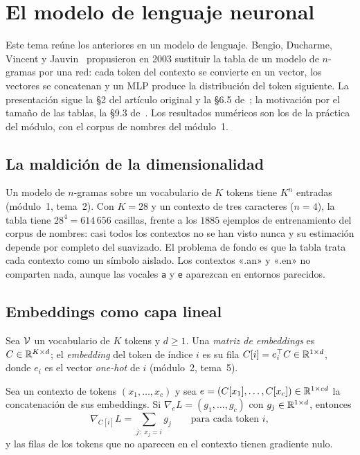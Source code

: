 \chapter{El modelo de lenguaje neuronal}
\label{tema:6}

Este tema reúne los anteriores en un modelo de lenguaje. Bengio, Ducharme, Vincent y Jauvin~\cite{bengio} propusieron en 2003 sustituir la tabla de un modelo de $n$-gramas por una red: cada token del contexto se convierte en un vector, los vectores se concatenan y un MLP produce la distribución del token siguiente. La presentación sigue la §2 del artículo original y la §6.5 de~\cite{jm3}; la motivación por el tamaño de las tablas, la §9.3 de~\cite{d2l}. Los resultados numéricos son los de la práctica del módulo, con el corpus de nombres del módulo~1.

\section{La maldición de la dimensionalidad}

Un modelo de $n$-gramas sobre un vocabulario de $K$ tokens tiene $K^{n}$ entradas (módulo~1, tema~2). Con $K=28$ y un contexto de tres caracteres ($n=4$), la tabla tiene $28^{4}=614\,656$ casillas, frente a los $1885$ ejemplos de entrenamiento del corpus de nombres: casi todos los contextos no se han visto nunca y su estimación depende por completo del suavizado. El problema de fondo es que la tabla trata cada contexto como un símbolo aislado. Los contextos «.an» y «.en» no comparten nada, aunque las vocales \texttt{a} y \texttt{e} aparezcan en entornos parecidos.

\section{Embeddings como capa lineal}

\begin{definicion}
Sea $\mathcal{V}$ un vocabulario de $K$ tokens y $d\ge 1$. Una \emph{matriz de embeddings} es $C\in\mathbb{R}^{K\times d}$; el \emph{embedding} del token de índice $i$ es su fila $C[i]=e_i^{\top}C\in\mathbb{R}^{1\times d}$, donde $e_i$ es el vector \emph{one-hot} de $i$ (módulo~2, tema~5).
\end{definicion}

\begin{proposicion}\label{prop:grad-embedding}
Sea un contexto de tokens $(x_1,\dots,x_c)$ y sea $e=(C[x_1],\dots,C[x_c])\in\mathbb{R}^{1\times cd}$ la concatenación de sus embeddings. Si $\nabla_{\!e}L=(g_1,\dots,g_c)$ con $g_j\in\mathbb{R}^{1\times d}$, entonces
\[
\nabla_{\!C[i]}L=\sum_{j\,:\,x_j=i}g_j\qquad\text{para cada token } i,
\]
y las filas de los tokens que no aparecen en el contexto tienen gradiente nulo.
\end{proposicion}

